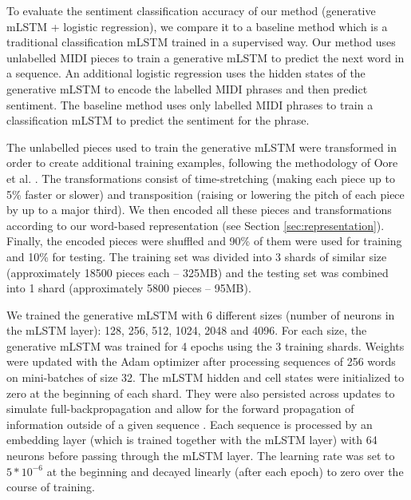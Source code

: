 To evaluate the sentiment classification accuracy of our method (generative mLSTM +
logistic regression), we compare it to a baseline method which is a
traditional classification mLSTM trained in a supervised way. Our method uses
unlabelled MIDI pieces to train a generative mLSTM to predict the next word in a
sequence. An additional logistic regression uses the hidden states of the generative
mLSTM to encode the labelled MIDI phrases and then predict sentiment.
The baseline method uses only labelled MIDI phrases to train a
classification mLSTM to predict the sentiment for the phrase.

The unlabelled pieces used to train the generative mLSTM  were
transformed in order to create additional training examples,
following the methodology of Oore et al.
\cite{oore2017learning}. The transformations consist of time-stretching (making
each piece up to 5\% faster or slower) and transposition (raising or lowering
the pitch of each piece by up to a major third). We then encoded all these
pieces and transformations according to our word-based representation (see
Section \ref{sec:representation}). Finally, the encoded pieces were shuffled
and 90\% of them were used for training and 10\% for testing. The training set was divided into 3 shards of similar size (approximately 18500 pieces each -- 325MB) and the testing set was combined into 1 shard (approximately 5800 pieces -- 95MB).

We trained the generative mLSTM with 6 different sizes (number of neurons
in the mLSTM layer): 128, 256, 512, 1024, 2048 and 4096. For each size,
the generative mLSTM was trained for 4 epochs using the 3 training
shards. Weights were updated with the Adam optimizer after processing
sequences of 256 words on mini-batches of size 32. The mLSTM hidden
and cell states were initialized to zero at the beginning of each
shard. They were also persisted across updates to simulate
full-backpropagation and allow for the forward propagation of
information outside of a given sequence \cite{radford_2017}. Each sequence is
processed by an embedding layer (which is trained together with
the mLSTM layer) with 64 neurons before passing through the mLSTM layer.
The learning rate was set to $5*10^{-6}$ at the beginning and decayed linearly
(after each epoch) to zero over the course of training.

